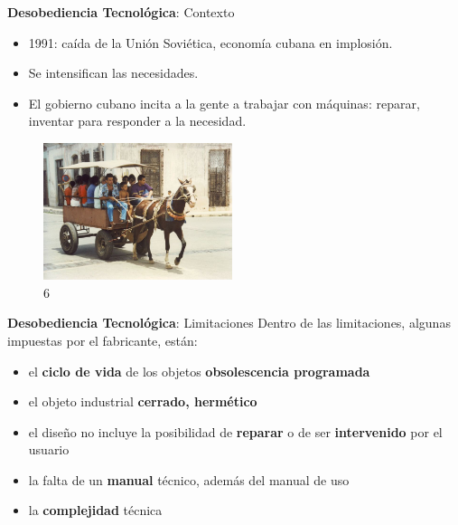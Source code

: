 \documentclass[spanish]{beamer}
\begin{document}
\begin{frame}{\textbf{Desobediencia Tecnológica}: Contexto}
    \begin{itemize}
        \item 1991: caída de la Unión Soviética, economía cubana en implosión.
        \item Se intensifican las necesidades.
        \item El gobierno cubano incita a la gente a trabajar con máquinas: reparar, inventar para responder a la necesidad.
    \end{itemize}
    \begin{figure}
        \includegraphics[height=4cm]{img/periodo_especial.jpg}
        \vspace*{-3mm}
        \caption{ 6}
    \end{figure}
\end{frame}

\begin{frame}{\textbf{Desobediencia Tecnológica}: Limitaciones}
    Dentro de las limitaciones, algunas impuestas por el fabricante, están:

    \begin{itemize}
        \item el \textbf{ciclo de vida} de los objetos \MVRightArrow{} \textbf{obsolescencia programada}
        \item el objeto industrial \textbf{cerrado, hermético}
        \item el diseño no incluye la posibilidad de \textbf{reparar} o de ser \textbf{intervenido} por el usuario
        \item la falta de un \textbf{manual} técnico, además del manual de uso
        \item la \textbf{complejidad} técnica
    \end{itemize}
\end{frame}
\end{document}
